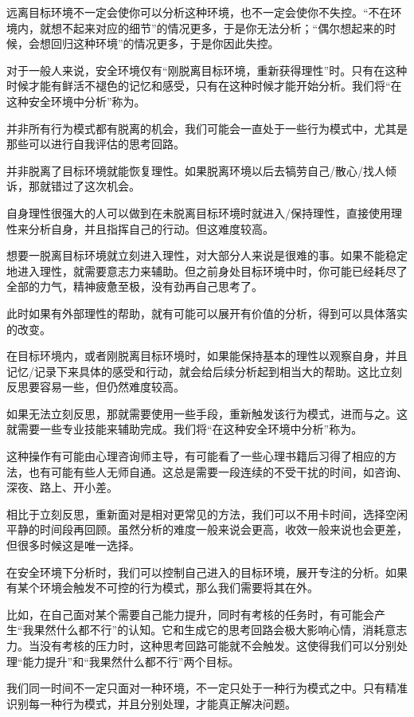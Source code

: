 \begin{examples}
远离目标环境不一定会使你可以分析这种环境，也不一定会使你不失控。“不在环境内，就想不起来对应的细节”的情况更多，于是你无法分析；“偶尔想起来的时候，会想回归这种环境”的情况更多，于是你因此失控。
\end{examples}
对于一般人来说，安全环境仅有“刚脱离目标环境，重新获得理性”时。只有在这种时候才能有鲜活不褪色的记忆和感受，只有在这种时候才能开始分析。我们将“在这种安全环境中分析”称为。
\begin{explain}
并非所有行为模式都有脱离的机会，我们可能会一直处于一些行为模式中，尤其是那些可以进行自我评估的思考回路。

并非脱离了目标环境就能恢复理性。如果脱离环境以后去犒劳自己/散心/找人倾诉，那就错过了这次机会。

自身理性很强大的人可以做到在未脱离目标环境时就进入/保持理性，直接使用理性来分析自身，并且指挥自己的行动。但这难度较高。
\end{explain}
想要一脱离目标环境就立刻进入理性，对大部分人来说是很难的事。如果不能稳定地进入理性，就需要意志力来辅助。但之前身处目标环境中时，你可能已经耗尽了全部的力气，精神疲惫至极，没有劲再自己思考了。
\begin{explain}
此时如果有外部理性的帮助，就有可能可以展开有价值的分析，得到可以具体落实的改变。

在目标环境内，或者刚脱离目标环境时，如果能保持基本的理性以观察自身，并且记忆/记录下来具体的感受和行动，就会给后续分析起到相当大的帮助。这比立刻反思要容易一些，但仍然难度较高。
\end{explain}
如果无法立刻反思，那就需要使用一些手段，重新触发该行为模式，进而与之。这就需要一些专业技能来辅助完成。我们将“在这种安全环境中分析”称为。
\begin{explain}
这种操作有可能由心理咨询师主导，有可能看了一些心理书籍后习得了相应的方法，也有可能有些人无师自通。这总是需要一段连续的不受干扰的时间，如咨询、深夜、路上、开小差。

相比于立刻反思，重新面对是相对更常见的方法，我们可以不用卡时间，选择空闲平静的时间段再回顾。虽然分析的难度一般来说会更高，收效一般来说也会更差，但很多时候这是唯一选择。
\end{explain}
在安全环境下分析时，我们可以控制自己进入的目标环境，展开专注的分析。如果有某个环境会触发不可控的行为模式，那么我们需要将其在外。
\begin{examples}
比如，在自己面对某个需要自己能力提升，同时有考核的任务时，有可能会产生“我果然什么都不行”的认知。它和生成它的思考回路会极大影响心情，消耗意志力。当没有考核的压力时，这种思考回路可能就不会触发。这使得我们可以分别处理“能力提升”和“我果然什么都不行”两个目标。

我们同一时间不一定只面对一种环境，不一定只处于一种行为模式之中。只有精准识别每一种行为模式，并且分别处理，才能真正解决问题。
\end{examples}
